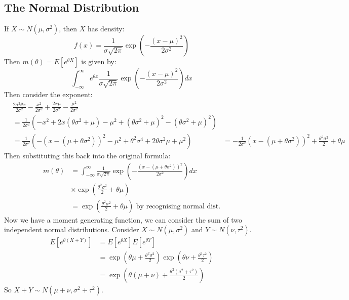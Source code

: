 \documentclass[../Main.tex]{subfiles}
\begin{document}
\subsection{The Normal Distribution}
If $X \sim N(\mu, \sigma^2)$, then $X$ has density:
\begin{equation*}
    f(x) = \frac{1}{\sigma\sqrt{2\pi}} \exp\left(-\frac{(x - \mu)^2}{2\sigma^2}\right)
\end{equation*}
Then $m(\theta) = E[e^{\theta X}]$ is given by:
\begin{equation*}
    \int_{-\infty}^\infty e^{\theta x} \frac{1}{\sigma\sqrt{2\pi}} \exp\left(-\frac{(x - \mu)^2}{2\sigma^2}\right) dx
\end{equation*}
Then consider the exponent:
\begin{align*}
    &\frac{2\sigma^2\theta x}{2\sigma^2} - \frac{x^2}{2\sigma^2} + \frac{2x\mu}{2\sigma^2} - \frac{\mu^2}{2\sigma^2} \\
    &= \frac{1}{2\sigma^2}\left(-x^2 + 2x(\theta \sigma^2 + \mu) - \mu^2 + (\theta \sigma^2 + \mu)^2 - (\theta \sigma^2 + \mu)^2\right) \\
    &= \frac{1}{2\sigma^2}\left(-(x - (\mu + \theta \sigma^2))^2 - \mu^2 + \theta^2 \sigma^4 + 2\theta \sigma^2 \mu + \mu^2\right)
    &= -\frac{1}{2\sigma^2}(x - (\mu + \theta \sigma^2))^2 + \frac{\theta^2 \sigma^2}{2} + \theta \mu
\end{align*}
Then substituting this back into the original formula:
\begin{align*}
    m(\theta) &= \int_{-\infty}^\infty \frac{1}{\sigma\sqrt{2\pi}} \exp\left(-\frac{(x - (\mu + \theta \sigma^2))^2}{2\sigma^2}\right)dx \\
    &\times \exp\left(\frac{\theta^2 \sigma^2}{2} + \theta \mu\right) \\
    &= \exp\left(\frac{\theta^2 \sigma^2}{2} + \theta \mu\right) \text{ by recognising normal dist.}
\end{align*}
Now we have a moment generating function, we can consider the sum of two independent normal distributions. Consider $X \sim N(\mu, \sigma^2)$ and $Y \sim N(\nu, \tau^2)$.
\begin{align*}
    E[e^{\theta(X + Y)}] &= E[e^{\theta X}] E[e^{\theta Y}] \\
    &= \exp\left(\theta \mu + \frac{\theta^2 \sigma^2}{2}\right) \exp\left(\theta \nu + \frac{\theta^2 \tau^2}{2}\right) \\
    &= \exp\left(\theta (\mu + \nu) + \frac{\theta^2 (\sigma^2 + \tau^2)}{2}\right)
\end{align*}
So $X + Y \sim N(\mu + \nu, \sigma^2 + \tau^2)$.
\end{document}
